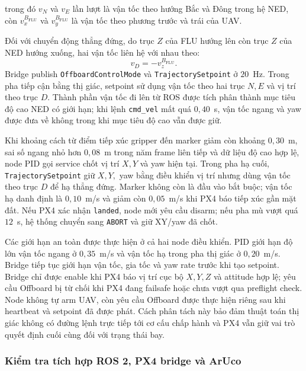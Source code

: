 trong đó $v_N$ và $v_E$ lần lượt là vận
tốc theo hướng Bắc và Đông trong hệ NED,
còn $v_x^{B_{\mathrm{FLU}}}$ và
$v_y^{B_{\mathrm{FLU}}}$ là vận tốc
theo phương trước và trái của UAV.

Đối với chuyển động thẳng đứng, do
trục $Z$ của FLU hướng lên còn trục
$Z$ của NED hướng xuống, hai vận tốc
liên hệ với nhau theo:
\begin{equation}
v_D=-v_z^{B_{\mathrm{FLU}}}.
\label{eq:vertical_velocity_conversion}
\end{equation}
\indent Bridge publish \texttt{OffboardControlMode} và \texttt{TrajectorySetpoint} ở $20$~Hz. Trong pha tiếp cận bằng thị giác, setpoint sử dụng vận tốc theo hai trục $N,E$ và vị trí theo trục $D$. Thành phần vận tốc đi lên từ ROS được tích phân thành mục tiêu độ cao NED có giới hạn; khi lệnh \texttt{cmd\_vel} mất quá $0{,}40$~s, vận tốc ngang và yaw được đưa về không trong khi mục tiêu độ cao vẫn được giữ.

Khi khoảng cách từ điểm tiếp xúc gripper đến marker giảm còn khoảng $0{,}30$~m, sai số ngang nhỏ hơn $0{,}08$~m trong năm frame liên tiếp và dữ liệu độ cao hợp lệ, node PID gọi service chốt vị trí $X,Y$ và yaw hiện tại. Trong pha hạ cuối, \texttt{TrajectorySetpoint} giữ $X,Y,$ yaw bằng điều khiển vị trí nhưng dùng vận tốc theo trục $D$ để hạ thẳng đứng. Marker không còn là đầu vào bắt buộc; vận tốc hạ danh định là $0{,}10$~m/s và giảm còn $0{,}05$~m/s khi PX4 báo tiếp xúc gần mặt đất. Nếu PX4 xác nhận \texttt{landed}, node mới yêu cầu disarm; nếu pha mù vượt quá $12$~s, hệ thống chuyển sang \texttt{ABORT} và giữ XY/yaw đã chốt.

Các giới hạn an toàn được thực hiện ở cả hai node điều khiển. PID giới hạn độ lớn vận tốc ngang ở $0{,}35$~m/s và vận tốc hạ trong pha thị giác ở $0{,}20$~m/s. Bridge tiếp tục giới hạn vận tốc, gia tốc và yaw rate trước khi tạo setpoint. Bridge chỉ được enable khi PX4 báo vị trí cục bộ $X,Y,Z$ và attitude hợp lệ; yêu cầu Offboard bị từ chối khi PX4 đang failsafe hoặc chưa vượt qua preflight check. Node không tự arm UAV, còn yêu cầu Offboard được thực hiện riêng sau khi heartbeat và setpoint đã được phát. Cách phân tách này bảo đảm thuật toán thị giác không có đường lệnh trực tiếp tới cơ cấu chấp hành và PX4 vẫn giữ vai trò quyết định cuối cùng đối với trạng thái bay.

\subsubsection{Kiểm tra tích hợp ROS 2, PX4 bridge và ArUco}

